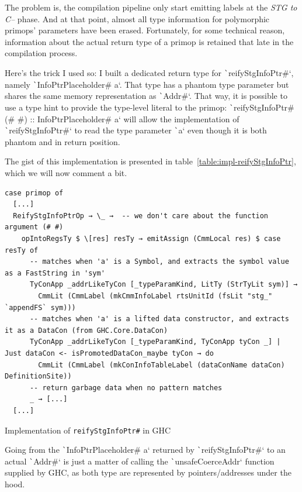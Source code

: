 \documentclass[english]{jflart}
\begin{document}
The problem is, the compilation pipeline only start emitting labels at the \emph{STG to C--} phase. And at that point, almost all type information for polymorphic primops' parameters have been erased. Fortunately, for some technical reason, information about the actual return type of a primop is retained that late in the compilation process.

Here's the trick I used so: I built a dedicated return type for \texttt`reifyStgInfoPtr#`, namely \texttt`InfoPtrPlaceholder# a`. That type has a phantom type parameter but shares the same memory representation as \texttt`Addr#`. That way, it is possible to use a type hint to provide the type-level literal to the primop: \texttt`reifyStgInfoPtr# (# #) :: InfoPtrPlaceholder# a` will allow the implementation of \texttt`reifyStgInfoPtr#` to read the type parameter \texttt`a` even though it is both phantom and in return position.

The gist of this implementation is presented in table~\ref{table:impl-reifyStgInfoPtr}, which we will now comment a bit.

\begin{table}[H]
\small
\begin{verbatim}
case primop of
  [...]
  ReifyStgInfoPtrOp → \_ →  -- we don't care about the function argument (# #)
    opIntoRegsTy $ \[res] resTy → emitAssign (CmmLocal res) $ case resTy of
      -- matches when 'a' is a Symbol, and extracts the symbol value as a FastString in 'sym'
      TyConApp _addrLikeTyCon [_typeParamKind, LitTy (StrTyLit sym)] →
        CmmLit (CmmLabel (mkCmmInfoLabel rtsUnitId (fsLit "stg_" `appendFS` sym)))
      -- matches when 'a' is a lifted data constructor, and extracts it as a DataCon (from GHC.Core.DataCon)
      TyConApp _addrLikeTyCon [_typeParamKind, TyConApp tyCon _] | Just dataCon <- isPromotedDataCon_maybe tyCon → do
        CmmLit (CmmLabel (mkConInfoTableLabel (dataConName dataCon) DefinitionSite))
      -- return garbage data when no pattern matches
      _ → [...]
  [...]
\end{verbatim}
\caption{Implementation of \texttt{reifyStgInfoPtr\#} in GHC}
\label{table:impl-reifyStgInfoPtr}
\end{table}

Going from the \texttt`InfoPtrPlaceholder# a` returned by \texttt`reifyStgInfoPtr#` to an actual \texttt`Addr#` is just a matter of calling the \texttt`unsafeCoerceAddr` function supplied by GHC, as both type are represented by pointers/addresses under the hood.
\end{document}
